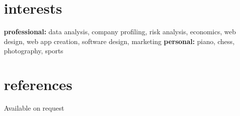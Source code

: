 \documentclass[]{friggeri-cv} %
\begin{document}

\section{interests}

\textbf{professional:} data analysis, company profiling, risk analysis, economics, web design, web app creation, software design, marketing 
\textbf{personal:} piano, chess, photography, sports


\section{references}

Available on request
\end{document}
